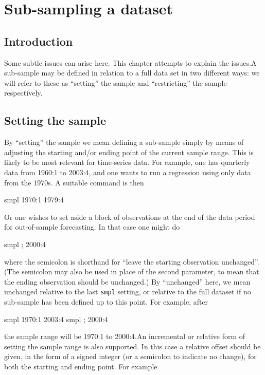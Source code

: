 \chapter{Sub-sampling a dataset}
\label{sampling}

\section{Introduction}
\label{sample-intro}

Some subtle issues can arise here.  This chapter attempts to explain
the issues.A sub-sample may be defined in relation to a full data set
in two different ways: we will refer to these as ``setting'' the
sample and ``restricting'' the sample respectively.

\section{Setting the sample}
\label{sample-set}

By ``setting'' the sample we mean defining a sub-sample simply by
means of adjusting the starting and/or ending point of the current
sample range.  This is likely to be most relevant for time-series
data.  For example, one has quarterly data from 1960:1 to 2003:4, and
one wants to run a regression using only data from the 1970s.  A
suitable command is then

\begin{code}
    smpl 1970:1 1979:4
\end{code}

Or one wishes to set aside a block of observations at the end of the
data period for out-of-sample forecasting.  In that case one might do

\begin{code}
    smpl ; 2000:4
\end{code}

where the semicolon is shorthand for ``leave the starting observation
unchanged''.  (The semicolon may also be used in place of the second
parameter, to mean that the ending observation should be unchanged.)
By ``unchanged'' here, we mean unchanged relative to the last
\verb+smpl+ setting, or relative to the full dataset if no sub-sample
has been defined up to this point. For example, after

\begin{code}
    smpl 1970:1 2003:4
    smpl ; 2000:4
\end{code}

the sample range will be 1970:1 to 2000:4.An incremental or relative
form of setting the sample range is also supported.  In this case a
relative offset should be given, in the form of a signed integer (or a
semicolon to indicate no change), for both the starting and ending
point. For example

